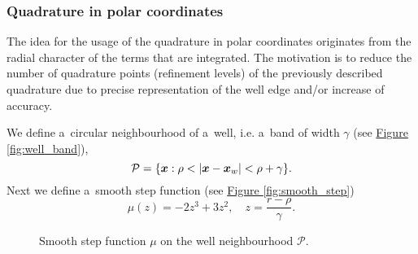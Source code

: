 \documentclass[dvipsnames,FM,Dis]{tulthesis}
\newcommand{\fig}[1]{\hyperref[#1]{Figure \ref{#1}}}
\newcommand{\figpath}{figures/}
\begin{document}
\subsubsection{Quadrature in polar coordinates}

The idea for the usage of the quadrature in polar coordinates originates from the radial character of the terms
that are integrated. 
The motivation is to reduce the number of quadrature points (refinement levels) of the previously described quadrature due to
precise representation of the well edge and/or increase of accuracy.

We define a~circular neighbourhood of a~well, i.e. a~band of width $\gamma$ (see \fig{fig:well_band}),
\[ \mathcal{P} = \{\mathbf{\boldsymbol{x}}: \rho < \left|\mathbf{\boldsymbol{x}} - \mathbf{\boldsymbol{x}}_w\right| < \rho + \gamma \}.\]
Next we define a~smooth step function (see \fig{fig:smooth_step})
\[\mu(z) = -2 z^3 +3 z^2,\quad z=\frac{r-\rho}{\gamma}.\]%
%
\begin{figure}[!htb]
  \vspace{-35pt}
  \centering    
  \hspace{0pt}
  \caption[Smooth step function]
  {Smooth step function $\mu$ on the well neighbourhood $\mathcal{P}$.
  }
  \label{fig:smooth_step_well_band}
\end{figure}    
\end{document}
